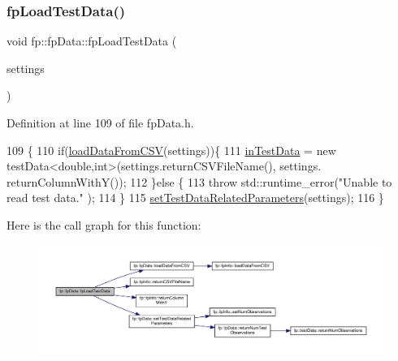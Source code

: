 \subsubsection{\texorpdfstring{fp\+Load\+Test\+Data()}{fpLoadTestData()}}
{\footnotesize\ttfamily void fp\+::fp\+Data\+::fp\+Load\+Test\+Data (\begin{DoxyParamCaption}\item[{\hyperlink{classfp_1_1fpInfo}{fp\+Info} \&}]{settings }\end{DoxyParamCaption})\hspace{0.3cm}{\ttfamily [inline]}}



Definition at line 109 of file fp\+Data.\+h.


\begin{DoxyCode}
109                                                  \{
110                 \textcolor{keywordflow}{if}(\hyperlink{classfp_1_1fpData_a2b4d9be328aaa7acf9a2561150da0402}{loadDataFromCSV}(settings))\{
111                     \hyperlink{classfp_1_1fpData_ad4f4dd3a8d15633b7f983932fa60bbad}{inTestData} = \textcolor{keyword}{new} testData<double,int>(settings.returnCSVFileName(), settings.
      returnColumnWithY());
112                 \}\textcolor{keywordflow}{else} \{
113                     \textcolor{keywordflow}{throw} std::runtime\_error(\textcolor{stringliteral}{"Unable to read test data."} );
114                 \}
115                 \hyperlink{classfp_1_1fpData_ab60d2098334e253a0bf3115f029c1996}{setTestDataRelatedParameters}(settings);
116             \}
\end{DoxyCode}
Here is the call graph for this function\+:
\nopagebreak
\begin{figure}[H]
\begin{center}
\leavevmode
\includegraphics[width=350pt]{classfp_1_1fpData_a4b527bc84762c4708992b7fdce3d0602_cgraph}
\end{center}
\end{figure}
\mbox{\label{classfp_1_1fpData_a2b4d9be328aaa7acf9a2561150da0402}} 
